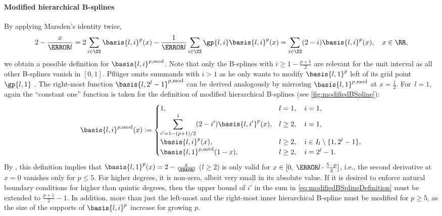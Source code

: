 \paragraph{Modified hierarchical B-splines}

By applying Marsden's identity twice,
\begin{equation}
  \label{eq:modifiedBSplineConstruction}
  2 - \frac{x}{\ms{l}}
  = 2 \sum_{i \in \ZZ} \basis{l,i}^p(x)
  - \frac{1}{\ms{l}} \sum_{i \in \ZZ} \gp{l,i} \basis{l,i}^p(x)
  = \sum_{i \in \ZZ} (2 - i) \basis{l,i}^p(x),\quad
  x \in \RR,
\end{equation}
we obtain a possible definition for $\basis{l,i}^{p,\modified}$.
Note that only the B-splines with $i \ge 1 - \tfrac{p+1}{2}$
are relevant for the unit interval as all other B-splines vanish in $[0, 1]$.
Pflüger omits summands with $i > 1$ as he only wants to modify
$\basis{l,1}^p$ left of its grid point $\gp{l,1}$ \cite{Pflueger10Spatially}.
The right-most function $\basis{l,2^l-1}^{p,\modified}$ can be derived
analogously by mirroring $\basis{l,1}^{p,\modified}$ at $x = \tfrac{1}{2}$.
For~$l = 1$, again the ``constant one'' function is taken for the definition
of modified hierarchical B-splines (see \cref{fig:modifiedBSpline}):
\begin{equation}
  \label{eq:modifiedBSplineDefinition}
  \basis{l,i}^{p,\modified}(x)
  :=
  \begin{cases}
    1,&
    l = 1,\quad i = 1,\\
    \displaystyle\sum_{i'=1-(p+1)/2}^1 (2 - i') \basis{l,i'}^p(x),&
    l \ge 2,\quad i = 1,\\
    \basis{l,i}^p(x),&
    l \ge 2,\quad i \in I_l \setminus \{1, 2^l - 1\},\\
    \basis{l,1}^{p,\modified}(1 - x),&
    l \ge 2,\quad i = 2^l - 1.
  \end{cases}
\end{equation}
By ,
this definition implies that
$\basis{l,1}^p(x) = 2 - \tfrac{x}{\ms{l}}$ ($l \ge 2$)
is only valid for $x \in [0,\; \ms{l} \cdot \tfrac{5-p}{2}]$, i.e.,
the second derivative at $x = 0$ vanishes only for $p \le 5$.
For higher degrees, it is non-zero, albeit very small
in its absolute value.
If it is desired to enforce natural boundary conditions
for higher than quintic degrees,
then the upper bound of $i'$ in the sum in \eqref{eq:modifiedBSplineDefinition}
must be extended to $\tfrac{p+1}{2} - 1$.
In addition, more than just the left-most and the right-most inner
hierarchical B-spline must be modified for $p \ge 5$,
as the size of the supports of $\basis{l,i}^p$ increase
for growing $p$.

